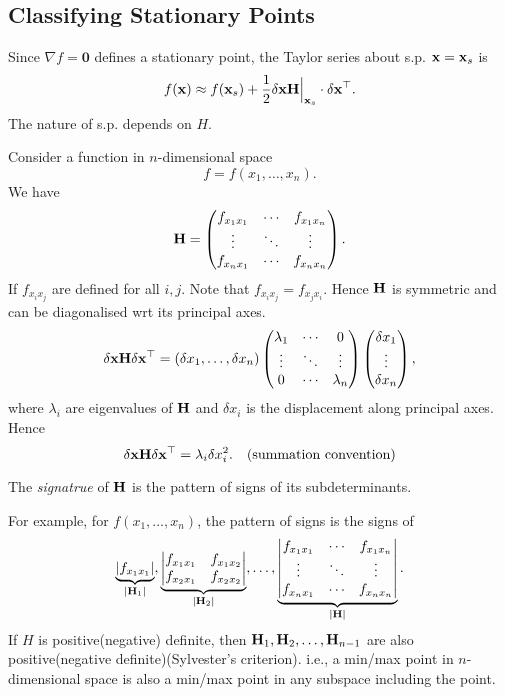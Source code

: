\documentclass[10pt]{article}
\begin{document}
      \subsection{Classifying Stationary Points}
      Since $ \nabla f= \mathbf{0} $ defines a stationary point, the Taylor series about s.p. $ {\bf x}={\bf x}_s $ is 
      \[
          f({\bf x})\approx f({\bf x}_s)+\frac{1}{2}\delta{\bf x} {\bf H}\Big|_{{\bf x}_s}\cdot \delta{\bf x}^{\top}.
      \]
      The nature of s.p. depends on $H$.

      Consider a function in $n$-dimensional space 
      \[
          f=f(x_1,\dots,x_n).
      \]
      We have
      \[
          {\bf H} = \begin{pmatrix}
              f_{x_1x_1}& \cdots & f_{x_1x_n}\\
              \vdots & \ddots & \vdots \\
              f_{x_nx_1}& \cdots & f_{x_nx_n}
          \end{pmatrix}.
      \]
      If $f_{x_ix_j}$ are defined for all $i,j$. Note that $f_{x_ix_j}=f_{x_jx_i}$. Hence ${\bf H}$ is symmetric and can be diagonalised wrt its principal axes.
      \[
          \delta{\bf x} {\bf H} \delta{\bf x}^{\top} = (\delta x_1,\dots,\delta x_n) \begin{pmatrix}
              \lambda_1&\cdots&0\\
              \vdots &\ddots &\vdots \\
              0& \cdots & \lambda_n
          \end{pmatrix}\begin{pmatrix}
              \delta x_1\\\vdots \\\delta x_n
          \end{pmatrix},
      \]
      where $ \lambda_i $ are eigenvalues of ${\bf H}$ and $ \delta x_i $ is the displacement along principal axes. Hence 
      \[
        \delta{\bf x} {\bf H} \delta{\bf x}^{\top} = \lambda_i\delta x_i^2.\quad (\text{summation convention})
      \]
      \begin{definition}
          The \textit{signatrue} of ${\bf H}$ is the pattern of signs of its subdeterminants.
      \end{definition}
      For example, for $f(x_1,\dots,x_n)$, the pattern of signs is the signs of 
      \[
          \underbrace{|f_{x_1x_1}|}_{|{\bf H}_1|}, \underbrace{\begin{vmatrix}
              f_{x_1x_1}&f_{x_1x_2}\\
              f_{x_2x_1}&f_{x_2x_2}
          \end{vmatrix}}_{|{\bf H}_2|}, \dots,\underbrace{\begin{vmatrix}
            f_{x_1x_1}& \cdots & f_{x_1x_n}\\
            \vdots & \ddots & \vdots \\
            f_{x_nx_1}& \cdots & f_{x_nx_n}
          \end{vmatrix}}_{|{\bf H}|}.
      \]
      If $H$ is positive(negative) definite, then ${\bf H}_1,{\bf H}_2,\dots,{\bf H}_{n-1}$ are also positive(negative definite)(Sylvester's criterion). i.e., a min/max point in $n$-dimensional space is also a min/max point in any subspace including the point.
\end{document}
